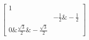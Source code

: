 \documentclass[preview]{standalone}
\begin{document}
\begin{align*}
\begin{bmatrix} 1 \\& -\frac{1}{2} \& -\frac{1}{2} \\ 0 \& \frac{\sqrt{3}}{2} \& -\frac{\sqrt{3}}{2} \end{bmatrix}
\end{align*}
\end{document}

